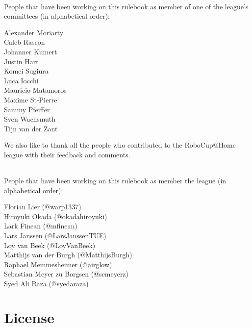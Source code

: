 ~\\\noindent People that have been working on this rulebook as member of one of the league's committees (in alphabetical order):
\begin{center}
\begin{minipage}{0.8\textwidth}
\begin{multicols}{3}%
\footnotesize
\noindent%

Alexander Moriarty\\
Caleb Rascon\\
Johanner Kumert\\
Justin Hart\\
\columnbreak
Komei Sugiura\\
Luca Iocchi\\
Mauricio Matamoros\\
Maxime St-Pierre \\
\columnbreak
Sammy Pfeiffer\\
Sven Wachsmuth\\
Tijn van der Zant\\
\end{multicols}
\end{minipage}
\end{center}

We also like to thank all the people who contributed to the RoboCup@Home league with their feedback and comments.

~\\\noindent People that have been working on this rulebook as member the league (in alphabetical order):
\begin{center}
\begin{minipage}{0.8\textwidth}
\begin{multicols}{2}%
\footnotesize
\noindent%
Florian Lier (@warp1337)\\
Hiroyuki Okada (@okadahiroyuki)\\
Lark Finean (@mfinean)\\
\columnbreak%
Lars Janssen (@LarsJanssenTUE)\\
Loy van Beek (@LoyVanBeek)\\
Matthijs van der Burgh (@MatthijsBurgh)\\
\columnbreak%
Raphael Memmesheimer (@airglow)\\
Sebastian Meyer zu Borgsen (@semeyerz)\\
Syed Ali Raza (@syedaraza)\\
\end{multicols}
\end{minipage}
\end{center}

\section*{License}

\doclicenseThis


